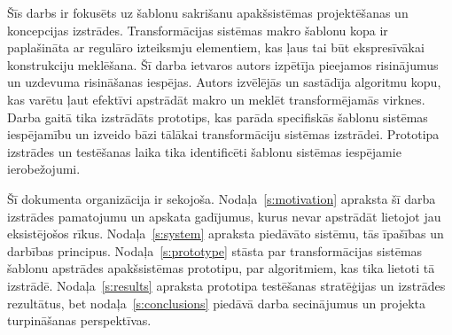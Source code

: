 Šīs darbs ir fokusēts uz šablonu sakrišanu apakšsistēmas projektēšanas un koncepcijas izstrādes. Transformācijas sistēmas makro šablonu kopa ir paplašināta ar regulāro izteiksmju elementiem, kas ļaus tai būt ekspresīvākai konstrukciju meklēšana. Šī darba ietvaros autors izpētīja pieejamos risinājumus un uzdevuma risināšanas iespējas. Autors izvēlējās un sastādīja algoritmu kopu, kas varētu ļaut efektīvi apstrādāt makro un meklēt transformējamās virknes. Darba gaitā tika izstrādāts prototips, kas parāda specifiskās šablonu sistēmas iespējamību un izveido bāzi tālākai transformāciju sistēmas izstrādei. Prototipa izstrādes un testēšanas laika tika identificēti šablonu sistēmas iespējamie ierobežojumi. 



Šī dokumenta organizācija ir sekojoša. Nodaļa~\ref{s:motivation} apraksta šī darba izstrādes pamatojumu un apskata gadījumus, kurus nevar apstrādāt lietojot jau eksistējošos rīkus. Nodaļa~\ref{s:system} apraksta piedāvāto sistēmu, tās īpašības un darbības principus. Nodaļa~\ref{s:prototype} stāsta par transformācijas sistēmas šablonu apstrādes apakšsistēmas prototipu, par algoritmiem, kas tika lietoti tā izstrādē. Nodaļa~\ref{s:results} apraksta prototipa testēšanas stratēģijas un izstrādes rezultātus, bet nodaļa~\ref{s:conclusions} piedāvā darba secinājumus un projekta turpināšanas perspektīvas.